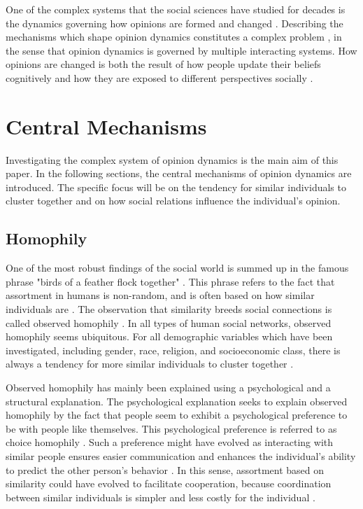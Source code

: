 \documentclass[11pt]{article}
\begin{document}
\noindent One of the complex systems that the social sciences have studied for decades is the dynamics governing how opinions are formed and changed \cite{flache_models_2017}. Describing the mechanisms which shape opinion dynamics constitutes a complex problem \cite{mas2019challenges}, in the sense that opinion dynamics is governed by multiple interacting systems. 
How opinions are changed is both the result of how people update their beliefs cognitively and how they are exposed to different perspectives socially \cite{friedkin_social_1990,spears_social_2021}. 

\section{Central Mechanisms}
Investigating the complex system of opinion dynamics is the main aim of this paper. In the following sections, the central mechanisms of opinion dynamics are introduced. The specific focus will be on the tendency for similar individuals to cluster together and on how social relations influence the individual's opinion. 

\subsection{Homophily}
One of the most robust findings of the social world is summed up in the famous phrase "birds of a feather flock together" \cite{mcpherson_birds_2001}. This phrase refers to the fact that assortment in humans is non-random, and is often based on how similar individuals are \cite{asikainen_cumulative_2020,crandall_feedback_2008,mcpherson_birds_2001}. The observation that similarity breeds social connections is called observed homophily \cite{mcpherson_birds_2001,kossinets_origins_2009}. In all types of human social networks, observed homophily seems ubiquitous.
For all demographic variables which have been investigated, including gender, race, religion, and socioeconomic class, there is always a tendency for more similar individuals to cluster together \cite{asikainen_cumulative_2020,mcpherson_birds_2001, taylor_exploring_2018}. 

\noindent Observed homophily has mainly been explained using a psychological and a structural explanation. The psychological explanation seeks to explain observed homophily by the fact that people seem to exhibit a psychological preference to be with people like themselves. This psychological preference is referred to as choice homophily \cite{asikainen_cumulative_2020,mcpherson_birds_2001,winter_you_2020}.
Such a preference might have evolved as interacting with similar people ensures easier communication and enhances the individual’s ability to predict the other person’s behavior \cite{kossinets_origins_2009,winter_you_2020}. In this sense, assortment based on similarity could have evolved to facilitate cooperation, because coordination between similar individuals is simpler and less costly for the individual \cite{winter_you_2020,carter2015phenotypic, smaldino2019social}. 
\end{document}
